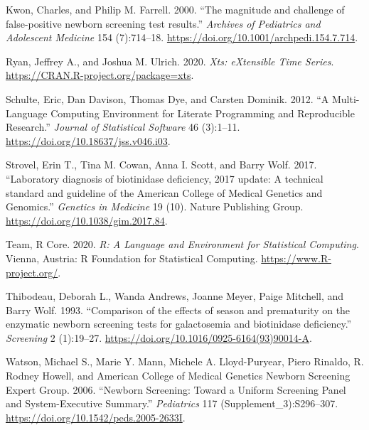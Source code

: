 \documentclass[review]{elsarticle}
\begin{document}
\begin{hangparas}{1.5em}{1}
\hypertarget{citeproc_bib_item_7}{Kwon, Charles, and Philip M. Farrell. 2000. “The magnitude and challenge of false-positive newborn screening test results.” \textit{Archives of Pediatrics and Adolescent Medicine} 154 (7):714–18. \href{https://doi.org/10.1001/archpedi.154.7.714}{https://doi.org/10.1001/archpedi.154.7.714}.}

\hypertarget{citeproc_bib_item_8}{Ryan, Jeffrey A., and Joshua M. Ulrich. 2020. \textit{Xts: eXtensible Time Series}. \href{https://CRAN.R-project.org/package=xts}{https://CRAN.R-project.org/package=xts}.}

\hypertarget{citeproc_bib_item_9}{Schulte, Eric, Dan Davison, Thomas Dye, and Carsten Dominik. 2012. “A Multi-Language Computing Environment for Literate Programming and Reproducible Research.” \textit{Journal of Statistical Software} 46 (3):1–11. \href{https://doi.org/10.18637/jss.v046.i03}{https://doi.org/10.18637/jss.v046.i03}.}

\hypertarget{citeproc_bib_item_10}{Strovel, Erin T., Tina M. Cowan, Anna I. Scott, and Barry Wolf. 2017. “Laboratory diagnosis of biotinidase deficiency, 2017 update: A technical standard and guideline of the American College of Medical Genetics and Genomics.” \textit{Genetics in Medicine} 19 (10). Nature Publishing Group. \href{https://doi.org/10.1038/gim.2017.84}{https://doi.org/10.1038/gim.2017.84}.}

\hypertarget{citeproc_bib_item_11}{Team, R Core. 2020. \textit{R: A Language and Environment for Statistical Computing}. Vienna, Austria: R Foundation for Statistical Computing. \href{https://www.R-project.org/}{https://www.R-project.org/}.}

\hypertarget{citeproc_bib_item_12}{Thibodeau, Deborah L., Wanda Andrews, Joanne Meyer, Paige Mitchell, and Barry Wolf. 1993. “Comparison of the effects of season and prematurity on the enzymatic newborn screening tests for galactosemia and biotinidase deficiency.” \textit{Screening} 2 (1):19–27. \href{https://doi.org/10.1016/0925-6164(93)90014-A}{https://doi.org/10.1016/0925-6164(93)90014-A}.}

\hypertarget{citeproc_bib_item_13}{Watson, Michael S., Marie Y. Mann, Michele A. Lloyd-Puryear, Piero Rinaldo, R. Rodney Howell, and American College of Medical Genetics Newborn Screening Expert Group. 2006. “Newborn Screening: Toward a Uniform Screening Panel and System-Executive Summary.” \textit{Pediatrics} 117 (Supplement\_3):S296–307. \href{https://doi.org/10.1542/peds.2005-2633I}{https://doi.org/10.1542/peds.2005-2633I}.}


\end{hangparas}
\end{document}
